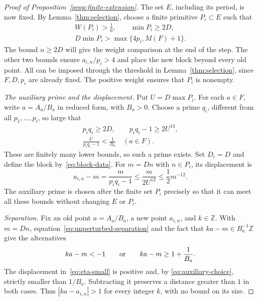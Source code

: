 \documentclass[11pt,reqno]{amsart}
\theoremstyle{definition}
\theoremstyle{remark}
\numberwithin{equation}{section}
\newcommand{\Z}{\mathbb Z}
\begin{document}
\begin{proof}[Proof of Proposition~\ref{prop:finite-extension}]
The set $E$, including its period, is now fixed. By
Lemma~\ref{thm:selection}, choose a finite primitive $P_i\subset E$
such that
\begin{equation}\label{eq:labels-choice}
 \begin{gathered}
 W(P_i)>\frac16,\qquad \min P_i\geq2D,\\
 D\min P_i>\max\{4p_i,M(F)+1\}.
 \end{gathered}
\end{equation}
The bound $n\geq2D$ will give the weight comparison at the end of the
step. The other two bounds ensure $a_{i,n}/p_i>4$ and place the new
block beyond every old point. All can be imposed through the threshold
in Lemma~\ref{thm:selection}, since $F,D,p_i$ are already fixed.
The positive weight ensures that $P_i$ is nonempty.

\smallskip
\noindent\emph{The auxiliary prime and the displacement.}
Put $U=D\max P_i$. For each $a\in F$, write $a=A_a/B_a$ in reduced
form, with $B_a>0$. Choose a prime $q_i$, different from all
$p_1,\ldots,p_i$, so large that
\begin{equation}\label{eq:auxiliary-choice}
 \begin{gathered}
 p_iq_i\geq2D,\qquad p_iq_i-1\geq2U^{13},\\
 \frac{U}{p_iq_i-1}<\frac1{B_a}\quad(a\in F).
 \end{gathered}
\end{equation}
These are finitely many lower bounds, so such a prime exists. Set
$D_i=D$ and define the block by~\eqref{eq:block-data}. For $m=Dn$ with
$n\in P_i$, its displacement is
\begin{equation}\label{eq:eta-small}
 a_{i,n}-m=\frac{m}{p_iq_i-1}
 \leq\frac{m}{2U^{13}}\leq\frac12m^{-12}.
\end{equation}
The auxiliary prime is chosen after the finite set $P_i$ precisely so
that it can meet all these bounds without changing $E$ or $P_i$.

\smallskip
\noindent\emph{Separation.}
Fix an old point $a=A_a/B_a$, a new point $a_{i,n}$, and $k\in\Z$.
With $m=Dn$, equation~\eqref{eq:unperturbed-separation} and the fact
that $ka-m\in B_a^{-1}\Z$ give the alternatives
\[
 ka-m<-1\qquad\hbox{or}\qquad ka-m\geq1+\frac1{B_a}.
\]
The displacement in~\eqref{eq:eta-small} is positive and, by
\eqref{eq:auxiliary-choice}, strictly smaller than $1/B_a$. Subtracting
it preserves a distance greater than $1$ in both cases. Thus
$|ka-a_{i,n}|>1$ for every integer $k$, with no bound on its size.


\end{proof}
\end{document}
